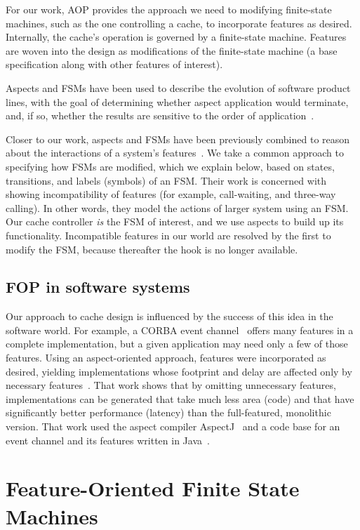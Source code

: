 \documentclass[conference]{IEEEtran}
\begin{document}
For our work, AOP provides the approach we need to modifying finite-state machines, such as the one controlling a cache, to incorporate features as desired.  
Internally, the cache's operation is governed by a finite-state machine.  Features are woven into the design as modifications of the finite-state machine (a base specification along with other features of interest).

Aspects and FSMs have been used to describe the evolution of software product lines, with the goal of determining whether aspect application would terminate, and, if so, whether the results are sensitive to the order of application~\cite{aspectsUML}.

Closer to our work, aspects and FSMs have been previously combined to reason about the interactions of a system's features~\cite{6078174}.  We take a common approach to specifying how FSMs are modified, which we explain below, based on states, transitions, and labels (symbols) of an FSM.  Their work is concerned with showing incompatibility of features (for example, call-waiting, and three-way calling).  In other words, they model the actions of larger system using an FSM.  Our cache controller \emph{is} the FSM of interest, and we use aspects to build up its functionality.   Incompatible features in our world are resolved by the first to modify the FSM, because thereafter the hook is no longer available.

\subsection{FOP in software systems}
Our approach to cache design is influenced by the success of this idea in the software world.  For example, a CORBA event channel~\cite{Defago:97} offers many features in a complete implementation, but a given application may need only a few of those features.  Using an aspect-oriented approach, features were incorporated as desired, yielding implementations whose footprint and delay are affected only by necessary features~\cite{Hunleth:02}.  That work shows that by omitting unnecessary features, implementations can be generated that take much less area (code) and that have significantly better performance (latency) than the full-featured, monolithic version.  That work used the aspect compiler AspectJ~\cite{AspectJ:01} and a code base for an event channel and its features written in Java~\cite{java:22}.


\section{Feature-Oriented Finite State Machines}\label{sec:fsm}
\end{document}
